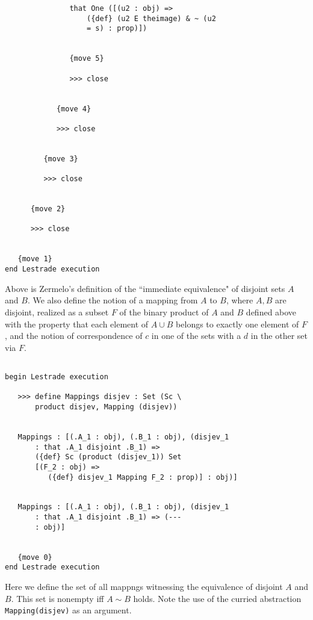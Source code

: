 \documentclass[12pt]{article}
\begin{document}
\begin{verbatim}
               that One ([(u2 : obj) => 
                   ({def} (u2 E theimage) & ~ (u2 
                   = s) : prop)])


               {move 5}

               >>> close


            {move 4}

            >>> close


         {move 3}

         >>> close


      {move 2}

      >>> close


   {move 1}
end Lestrade execution
\end{verbatim}

Above is Zermelo's definition of the ``immediate equivalence" of disjoint sets $A$ and $B$.  We also define the notion of a mapping from $A$ to $B$, where $A,B$ are disjoint, 
realized as a subset $F$ of the binary product of $A$ and $B$ defined above with the property that each element of $A \cup B$ belongs to exactly one element of $F$, and the notion of correspondence of $c$ in one of the sets with a $d$ in the other set via $F$.

\begin{verbatim}

begin Lestrade execution

   >>> define Mappings disjev : Set (Sc \
       product disjev, Mapping (disjev))


   Mappings : [(.A_1 : obj), (.B_1 : obj), (disjev_1 
       : that .A_1 disjoint .B_1) => 
       ({def} Sc (product (disjev_1)) Set 
       [(F_2 : obj) => 
          ({def} disjev_1 Mapping F_2 : prop)] : obj)]


   Mappings : [(.A_1 : obj), (.B_1 : obj), (disjev_1 
       : that .A_1 disjoint .B_1) => (--- 
       : obj)]


   {move 0}
end Lestrade execution
\end{verbatim}

Here we define the set of all mappngs witnessing the equivalence of disjoint $A$ and $B$.  This set is nonempty iff $A \sim B$ holds.  Note the use of the curried abstraction
{\tt Mapping(disjev)} as an argument.
\end{document}
